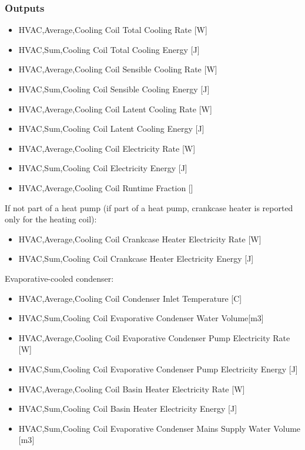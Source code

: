 \subsubsection{Outputs}\label{outputs-12-002}

\begin{itemize}
\item
  HVAC,Average,Cooling Coil Total Cooling Rate {[}W{]}
\item
  HVAC,Sum,Cooling Coil Total Cooling Energy {[}J{]}
\item
  HVAC,Average,Cooling Coil Sensible Cooling Rate {[}W{]}
\item
  HVAC,Sum,Cooling Coil Sensible Cooling Energy {[}J{]}
\item
  HVAC,Average,Cooling Coil Latent Cooling Rate {[}W{]}
\item
  HVAC,Sum,Cooling Coil Latent Cooling Energy {[}J{]}
\item
  HVAC,Average,Cooling Coil Electricity Rate {[}W{]}
\item
  HVAC,Sum,Cooling Coil Electricity Energy {[}J{]}
\item
  HVAC,Average,Cooling Coil Runtime Fraction {[]}
\end{itemize}

If not part of a heat pump (if part of a heat pump, crankcase heater is reported only for the heating coil):

\begin{itemize}
\item
  HVAC,Average,Cooling Coil Crankcase Heater Electricity Rate {[}W{]}
\item
  HVAC,Sum,Cooling Coil Crankcase Heater Electricity Energy {[}J{]}
\end{itemize}

Evaporative-cooled condenser:

\begin{itemize}
\item
  HVAC,Average,Cooling Coil Condenser Inlet Temperature {[}C{]}
\item
  HVAC,Sum,Cooling Coil Evaporative Condenser Water Volume{[}m3{]}
\item
  HVAC,Average,Cooling Coil Evaporative Condenser Pump Electricity Rate {[}W{]}
\item
  HVAC,Sum,Cooling Coil Evaporative Condenser Pump Electricity Energy {[}J{]}
\item
  HVAC,Average,Cooling Coil Basin Heater Electricity Rate {[}W{]}
\item
  HVAC,Sum,Cooling Coil Basin Heater Electricity Energy {[}J{]}
\item
  HVAC,Sum,Cooling Coil Evaporative Condenser Mains Supply Water Volume {[}m3{]}
\end{itemize}

